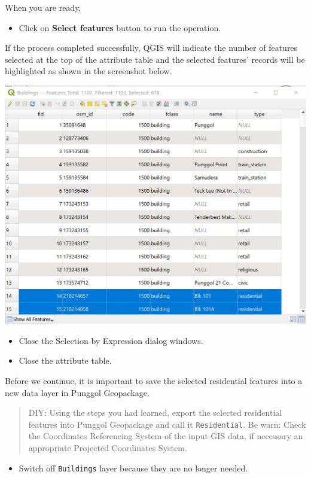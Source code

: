 \documentclass[
  letterpaper,
  DIV=11,
  numbers=noendperiod]{scrreprt}
\providecommand{\tightlist}{%
  \setlength{\itemsep}{0pt}\setlength{\parskip}{0pt}}\usepackage{longtable,booktabs,array}
\begin{document}
When you are ready,

\begin{itemize}
\tightlist
\item
  Click on \textbf{Select features} button to run the operation.
\end{itemize}

If the process completed successfully, QGIS will indicate the number of
features selected at the top of the attribute table and the selected
features' records will be highlighted as shown in the screenshot below.

\includegraphics{./img04/image104.jpg}

\begin{itemize}
\item
  Close the Selection by Expression dialog windows.
\item
  Close the attribute table.
\end{itemize}

Before we continue, it is important to save the selected residential
features into a new data layer in Punggol Geopackage.

\begin{quote}
DIY: Using the steps you had learned, export the selected residential
features into Punggol Geopackage and call it \texttt{Residential}. Be
warn: Check the Coordinates Referencing System of the input GIS data, if
necessary an appropriate Projected Coordinates System.
\end{quote}

\begin{itemize}
\tightlist
\item
  Switch off \texttt{Buildings} layer because they are no longer needed.
\end{itemize}
\end{document}
